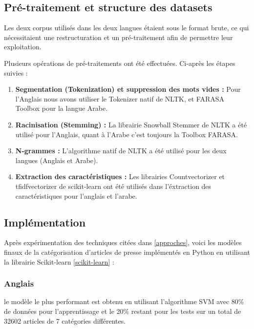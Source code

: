 \subsection{Pré-traitement et structure des datasets}
Les deux corpus utilisés dans les deux langues étaient sous le format brute, ce qui nécessitaient une restructuration et un pré-traitement afin de permettre leur exploitation.  

Plusieurs opérations de pré-traitements ont été effectuées. Ci-après les étapes suivies :
\begin{enumerate}
    \item{\textbf{Segmentation (Tokenization) et suppression des mots vides :} } Pour l'Anglais nous avons utiliser le Tokenizer natif de NLTK, et FARASA Toolbox pour la langue Arabe.\\  
    
    \item{\textbf{Racinisation (Stemming) :} } 
    La librairie Snowball Stemmer de NLTK a été utilisé pour l'Anglais, quant à l'Arabe c'est toujours la Toolbox FARASA.\\
    
    \item{\textbf{N-grammes :} }
    L'algorithme natif de NLTK a été utilisé pour les deux langues (Anglais et Arabe).\\ 
    
    \item{\textbf{Extraction des caractéristiques :} }
    Les librairies Countvectorizer et tfidfvectorizer de scikit-learn ont été utilisés dans l'éxtraction des caractéristiques pour l'anglais et l'arabe.\\
\end{enumerate}


\subsection{Implémentation}
Après expérimentation des techniques citées dans \ref{approches}, voici les modèles finaux de la catégorisation d'articles de presse implémentés en Python en utilisant la librairie Scikit-learn \ref{scikit-learn} :

    \subsubsection{Anglais}
    le modèle le plus performant est obtenu en utilisant l'algorithme SVM avec 80\% de données pour l'apprentissage et le 20\% restant pour les tests sur un total de 32602 articles de 7 catégories différentes.
    
